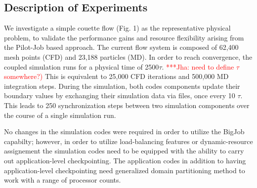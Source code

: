 \documentclass[conference,final]{IEEEtran}
\newcommand{\jhanote}[1]{ {\textcolor{red} { ***Jha: #1 }}}
\newcommand{\jhanote}[1]{}
\begin{document}

\subsection{Description of Experiments}

We investigate a simple couette flow (Fig. 1) as the representative
physical problem, to validate the performance gains and 
resource flexibility arising from the Pilot-Job based approach.
The current flow system is
composed of 62,400 mesh points (CFD) and 23,188 particles (MD).
In order to reach convergence, the coupled simulation runs for a
physical time of 2500$\tau$.  \jhanote{need to define $\tau$
  somewhere?)}  This is equivalent to 25,000 CFD iterations and
500,000 MD integration steps. During the simulation, both codes
components update their boundary values by exchanging their simulation
data via files, once every 10 $\tau$. This leads to 250
synchronization steps between two simulation components over
the course of a single simulation run.

No changes in the simulation codes were required in order
to utilize the BigJob capabilty; however, in order
to utilize load-balancing features or dynamic-resource
assignement the simulation codes need to be equipped
with the ability to carry out application-level checkpointing.
The application codes in addition to having application-level
checkpointing need generalized domain partitioning method to work
with a range of processor counts.

\end{document}
